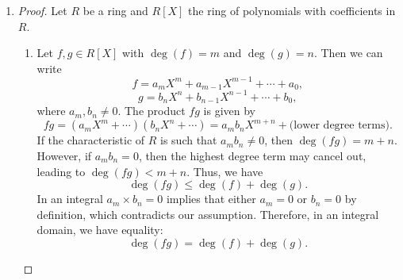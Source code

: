 \documentclass{article}
\begin{document}
\begin{enumerate}
\begin{enumerate}
\begin{proof}
            Furthermore, any polynomial in $\F[X]$ can be expressed as a finite linear combination of these monomials. Since we can find infinitely many linearly independent vectors (the monomials), it follows that the dimension of $\F[X]$ is infinite.
        \end{proof}
        \item %
        \begin{proof}
            Let $R$ be a ring and $R[X]$ the ring of polynomials with coefficients in $R$.
            \begin{enumerate}
                \item Let $f, g \in R[X]$ with $\deg(f) = m$ and $\deg(g) = n$. Then we can write
                \[
                    f = a_m X^m + a_{m-1} X^{m-1} + \cdots + a_0,
                \]
                \[
                    g = b_n X^n + b_{n-1} X^{n-1} + \cdots + b_0,
                \]
                where $a_m, b_n \neq 0$. The product $fg$ is given by
                \[
                    fg = (a_m X^m + \cdots)(b_n X^n + \cdots) = a_m b_n X^{m+n} + \text{(lower degree terms)}.
                \]
                If the characteristic of $R$ is such that $a_m b_n \neq 0$, then $\deg(fg) = m + n$. However, if $a_m b_n = 0$, then the highest degree term may cancel out, leading to $\deg(fg) < m + n$. Thus, we have
                \[
                    \deg(fg) \leq \deg(f) + \deg(g).
                \]
                In an integral $a_m \times b_n = 0$ implies that either $a_m = 0$ or $b_n = 0$ by definition, which contradicts our assumption. Therefore, in an integral domain, we have equality:
                \[
                    \deg(fg) = \deg(f) + \deg(g).
                \]


\end{enumerate}
\end{proof}
\end{enumerate}
\end{enumerate}
\end{document}
